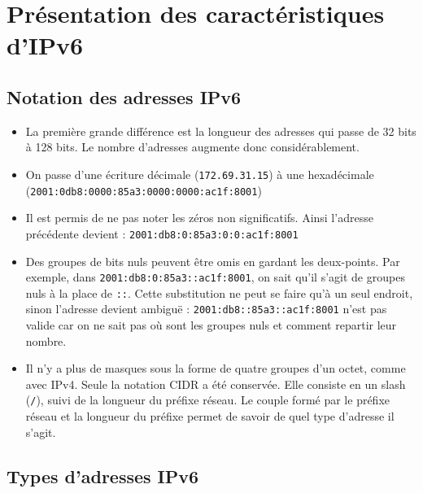 \section{Présentation des caractéristiques d’IPv6}
\subsection{Notation des adresses IPv6}
  
\begin{itemize}
  \item La première grande différence est la longueur des adresses qui passe de 32 bits à 128 bits. Le nombre d’adresses augmente donc considérablement.
  \item On passe d’une écriture décimale (\texttt{172.69.31.15}) à une hexadécimale (\texttt{2001:0db8:0000:85a3:0000:0000:ac1f:8001})
  \item Il est permis de ne pas noter les zéros non significatifs. Ainsi l'adresse précédente devient : \texttt{2001:db8:0:85a3:0:0:ac1f:8001}
  \item Des groupes de bits nuls peuvent être omis en gardant les deux-points. Par exemple, dans \texttt{2001:db8:0:85a3::ac1f:8001}, on sait qu'il s’agit de groupes nuls à la place de \texttt{::}. Cette substitution ne peut se faire qu’à un seul endroit, sinon l’adresse devient ambiguë : \texttt{2001:db8::85a3::ac1f:8001} n'est pas valide car on ne sait pas où sont les groupes nuls et comment repartir leur nombre.
  \item Il n’y a plus de masques sous la forme de quatre groupes d'un octet, comme avec IPv4.
Seule la notation CIDR a été conservée.
Elle consiste en un slash (\texttt{/}), suivi de la longueur du préfixe réseau.
Le couple formé par le préfixe réseau et la longueur du préfixe permet de savoir de quel type d’adresse il s’agit.
\end{itemize}

\subsection{Types d’adresses IPv6}

